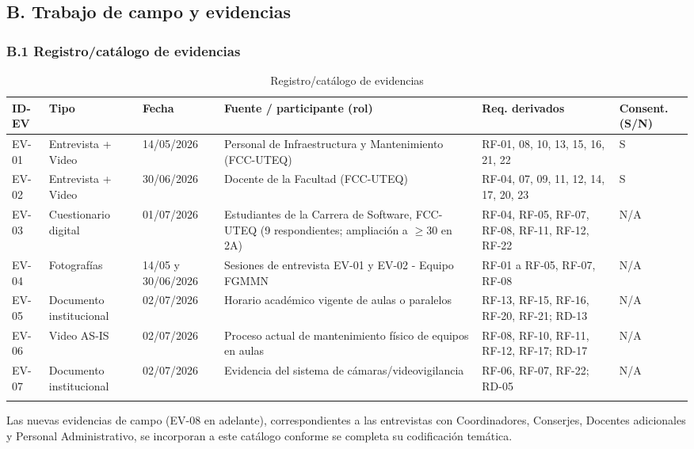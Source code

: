 \subsection*{B. Trabajo de campo y evidencias}


\subsubsection*{B.1 Registro/catálogo de evidencias}


\begingroup
\small
\begin{longtable}{|p{2.6cm}|p{2.6cm}|p{2.6cm}|p{2.6cm}|p{2.6cm}|p{2.6cm}|}
\hline
ID-EV & Tipo & Fecha & Fuente / participante (rol) & Req. derivados & Consent. (S/N) \\ \hline
EV-01 & Entrevista + Video & 14/05/2026 & Personal de Infraestructura y Mantenimiento (FCC-UTEQ) & RF-01, 08, 10, 13, 15, 16, 21, 22 & S \\ \hline
EV-02 & Entrevista + Video & 30/06/2026 & Docente de la Facultad (FCC-UTEQ) & RF-04, 07, 09, 11, 12, 14, 17, 20, 23 & S \\ \hline
EV-03 & Cuestionario digital & 01/07/2026 & Estudiantes de la Carrera de Software, FCC-UTEQ (9 respondientes; ampliación a $\geq$30 en 2A) & RF-04, RF-05, RF-07, RF-08, RF-11, RF-12, RF-22 & N/A \\ \hline
EV-04 & Fotografías & 14/05 y 30/06/2026 & Sesiones de entrevista EV-01 y EV-02 - Equipo FGMMN & RF-01 a RF-05, RF-07, RF-08 & N/A \\ \hline
EV-05 & Documento institucional & 02/07/2026 & Horario académico vigente de aulas o paralelos & RF-13, RF-15, RF-16, RF-20, RF-21; RD-13 & N/A \\ \hline
EV-06 & Video AS-IS & 02/07/2026 & Proceso actual de mantenimiento físico de equipos en aulas & RF-08, RF-10, RF-11, RF-12, RF-17; RD-17 & N/A \\ \hline
EV-07 & Documento institucional & 02/07/2026 & Evidencia del sistema de cámaras/videovigilancia & RF-06, RF-07, RF-22; RD-05 & N/A \\ \hline
\caption{Registro/catálogo de evidencias}
\end{longtable}
\endgroup

Las nuevas evidencias de campo (EV-08 en adelante), correspondientes a las entrevistas con Coordinadores, Conserjes, Docentes adicionales y Personal Administrativo, se incorporan a este catálogo conforme se completa su codificación temática.


